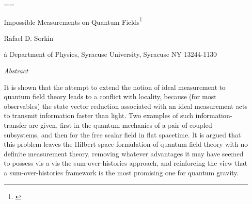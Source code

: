 \def\lapproxeq{\stacksymbols{<}{\sim}{2.5}{.2}}
\def\gapproxeq{\stacksymbols{>}{\sim}{3}{.5}}

\def\monthname {\ifcase\month\or January\or February\or March\or
April\or May\or June\or July\or August\or September\or October\or
November\or December\fi}

\newcount\mins  \newcount\hours  \hours=\time \mins=\time
\def\now{\divide\hours by60 \multiply\hours by60 \advance\mins by-\hours
     \divide\hours by60         %
     \ifnum\hours>12 \advance\hours by-12
       \number\hours:\ifnum\mins<10 0\fi\number\mins\ P.M.\else
       \number\hours:\ifnum\mins<10 0\fi\number\mins\ A.M.\fi}
\def\today {\monthname\ \number\day, \number\year}




\def\<{\langle}
\def\>{\rangle}
\def\tr{{\rm tr}}



\ct
Impossible Measurements on Quantum Fields\footnote{{\it *}}\par
{{\noindent\parindent=10pt}
}

\ca
Rafael D. Sorkin\par

\aa
Department of Physics, Syracuse University, Syracuse NY 13244-1130\par

\SkipToFirstLine


\tx
{\baselineskip=20pt
\centerline{\it Abstract}
{\baselineskip=13pt
{\leftskip=1.5cm\rightskip=1.5cm
It is shown that the attempt to extend the notion of ideal measurement
to quantum field theory leads to a conflict with locality, because
(for most observables) the state vector reduction associated with an
ideal measurement acts to transmit information faster than light.  Two
examples of such information-transfer are given, first in the quantum
mechanics of a pair of coupled subsystems, and then for the free
scalar field in flat spacetime.  It is argued that this problem leaves
the Hilbert space formulation of quantum field theory with no definite
measurement theory, removing whatever advantages it may have seemed to
possess vis a vis the sum-over-histories approach, and reinforcing the
view that a sum-over-histories framework is the most promising one for
quantum gravity.
\bigskip\bigskip}}}


